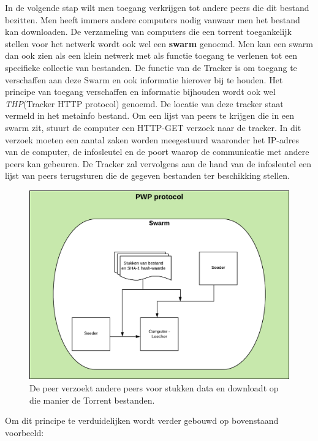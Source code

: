 In de volgende stap wilt men toegang verkrijgen tot andere peers die dit bestand bezitten. Men heeft immers andere computers nodig vanwaar men het bestand kan downloaden. De verzameling van computers die een torrent toegankelijk stellen voor het netwerk wordt ook wel een \textbf{swarm} genoemd. Men kan een swarm dan ook zien als een klein netwerk met als functie toegang te verlenen tot een specifieke collectie van bestanden. De functie van de Tracker is om toegang te verschaffen aan deze Swarm en ook informatie hierover bij te houden. Het principe van toegang verschaffen en informatie bijhouden wordt ook wel \textit{THP}(Tracker HTTP protocol) genoemd. De locatie van deze tracker staat vermeld in het metainfo bestand. Om een lijst van peers te krijgen die in een swarm zit, stuurt de computer een HTTP-GET verzoek naar de tracker. In dit verzoek moeten een aantal zaken worden meegestuurd waaronder het IP-adres van de computer, de infosleutel en de poort waarop de communicatie met andere peers kan gebeuren. De Tracker zal vervolgens aan de hand van de infosleutel een lijst van peers terugsturen die de gegeven bestanden ter beschikking stellen.\\

\begin{figure}[h!]
	\centering
		\includegraphics[scale=0.6]{torrent-3.png}
	\caption[PWP stap - Torrenting 3]{De peer verzoekt andere peers voor stukken data en downloadt op die manier de Torrent bestanden.}
\end{figure}
\newpage
Om dit principe te verduidelijken wordt verder gebouwd op bovenstaand voorbeeld:\\

